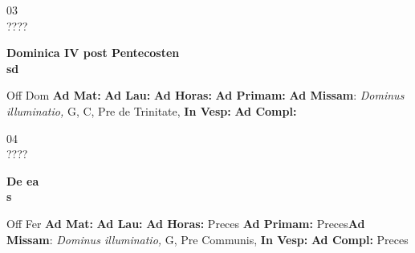 \documentclass[10pt, openany]{book}
\begin{document}
    \begin{center}
        \begin{minipage}{3.5in}
            \vspace{2em}
            \begin{minipage}{0.5in}
                {\Huge 03} \\
                {\normalsize ????}
            \end{minipage}
            \begin{minipage}{3.0in}
                \textbf{ \large Dominica IV post Pentecosten \\
                \textnormal{\normalsize sd}}

            \end{minipage}
            \begin{justify}Off Dom
                \textbf{Ad Mat: }
                \textbf{Ad Lau: }
                \textbf{Ad Horas: }
                \textbf{Ad Primam: }\textbf{Ad Missam}: \textit{Dominus illuminatio,} G, C, Pre de Trinitate, 
                \textbf{In Vesp: }
                \textbf{Ad Compl: }
            \end{justify}
        \end{minipage}
    \end{center}

    \begin{center}
        \begin{minipage}{3.5in}
            \vspace{2em}
            \begin{minipage}{0.5in}
                {\Huge 04} \\
                {\normalsize ????}
            \end{minipage}
            \begin{minipage}{3.0in}
                \textbf{ \large De ea \\
                \textnormal{\normalsize s}}

            \end{minipage}
            \begin{justify}Off Fer
                \textbf{Ad Mat: }
                \textbf{Ad Lau: }
                \textbf{Ad Horas: }Preces
                \textbf{Ad Primam: }Preces\textbf{Ad Missam}: \textit{Dominus illuminatio,} G, Pre Communis, 
                \textbf{In Vesp: }
                \textbf{Ad Compl: }Preces
            \end{justify}
        \end{minipage}
    \end{center}
\end{document}
